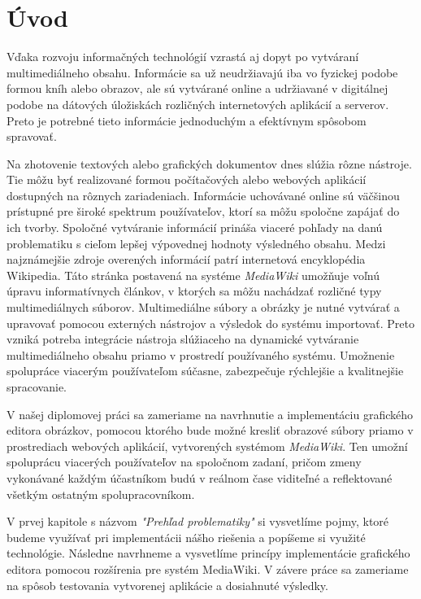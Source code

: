 
\chapter*{Úvod}\label{chap:intro}
Vďaka rozvoju informačných technológií vzrastá aj dopyt po vytváraní multimediálneho obsahu. Informácie sa už neudržiavajú iba vo fyzickej podobe formou kníh alebo obrazov, ale sú vytvárané online a udržiavané v digitálnej podobe na dátových úložiskách rozličných internetových aplikácií a serverov. Preto je potrebné tieto informácie jednoduchým a efektívnym spôsobom spravovať. 

Na zhotovenie textových alebo grafických dokumentov dnes slúžia rôzne nástroje. Tie môžu byť realizované formou počítačových alebo webových aplikácií dostupných na rôznych zariadeniach. Informácie uchovávané online sú väčšinou prístupné pre široké spektrum používateľov, ktorí sa môžu spoločne zapájať do ich tvorby. Spoločné vytváranie informácií prináša viaceré pohľady na danú problematiku s cieľom lepšej výpovednej hodnoty výsledného obsahu. Medzi najznámejšie zdroje overených informácií patrí internetová encyklopédia Wikipedia. Táto stránka postavená na systéme \textit{MediaWiki} umožňuje voľnú úpravu informatívnych článkov, v ktorých sa môžu nachádzať rozličné typy multimediálnych súborov. Multimediálne súbory a obrázky je nutné vytvárať a upravovať pomocou externých nástrojov a výsledok do systému importovať. Preto vzniká potreba integrácie nástroja slúžiaceho na dynamické vytváranie multimediálneho obsahu priamo v prostredí používaného systému. Umožnenie spolupráce viacerým používateľom súčasne, zabezpečuje rýchlejšie a kvalitnejšie spracovanie.

V našej diplomovej práci sa zameriame na navrhnutie a implementáciu grafického editora obrázkov, pomocou ktorého bude možné kresliť obrazové súbory priamo v prostrediach webových aplikácií, vytvorených systémom \textit{MediaWiki}. Ten umožní spoluprácu viacerých používateľov na spoločnom zadaní, pričom zmeny vykonávané každým účastníkom budú v reálnom čase viditeľné a reflektované všetkým ostatným spolupracovníkom. 

V prvej kapitole s názvom \textit{"Prehľad problematiky"} si vysvetlíme pojmy, ktoré budeme využívať pri implementácii nášho riešenia a popíšeme si využité technológie. Následne navrhneme a vysvetlíme princípy implementácie grafického editora pomocou rozšírenia pre systém MediaWiki. V závere práce sa zameriame na spôsob testovania vytvorenej aplikácie a dosiahnuté výsledky.
